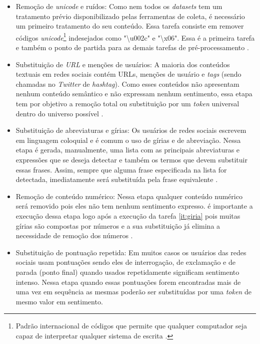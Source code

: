 \begin{itemize}
\item Remoção de \textit{unicode} e ruídos: Como nem todos os \textit{datasets} tem um tratamento prévio disponibilizado pelas ferramentas de coleta, é necessário um primeiro tratamento do seu conteúdo. Essa tarefa consiste em remover códigos \textit{unicode}\footnote{ Padrão internacional de códigos que permite que qualquer computador seja capaz de interpretar qualquer sistema de escrita \cite{0321480910}.} indesejados   como "\textbackslash u002c" e "\textbackslash x06". Essa é a primeira tarefa e também o ponto de partida para as demais tarefas de pré-processamento \cite{SYMEONIDIS2018298}.

\item Substituição de \textit{URL} e menções de usuários: A maioria dos conteúdos textuais em redes sociais contém URLs, menções de usuário e \textit{tags} (sendo chamadas no \textit{Twitter} de \textit{hashtag}). Como esses conteúdos não apresentam nenhum conteúdo semântico e não expressam nenhum sentimento, essa etapa tem por objetivo a remoção total ou substituição por um \textit{token} universal dentro do universo possível \cite{Khan2014}.
\label{it:giria}

\item Substituição de abreviaturas e gírias: Os usuários de redes sociais escrevem em linguagem coloquial e é comum o uso de gírias e de abreviação. Nessa etapa é gerada, manualmente, uma lista com as principais abreviaturas e expressões que se deseja detectar e também os termos que devem substituir essas frases. Assim, sempre que alguma frase especificada na lista for detectada, imediatamente será substituída pela frase equivalente \cite{Kouloumpis}.

\item Remoção de conteúdo numérico: Nessa etapa qualquer conteúdo numérico será removido pois eles não tem nenhum sentimento expresso. é importante a execução dessa etapa logo após a execução da tarefa \ref{it:giria} pois muitas gírias são compostas por números e a sua substituição já elimina a necessidade de remoção dos números \cite{He:2011:AEP:2002472.2002489}.

\item Substituição de pontuação repetida: Em muitos casos os usuários das redes sociais usam pontuações sendo eles de interrogação, de exclamação e de parada (ponto final) quando usados repetidamente significam sentimento intenso. Nessa etapa quando essas pontuações forem encontradas mais de uma vez em sequência as mesmas poderão ser substituídas por uma \textit{token} de mesmo valor em sentimento.


\end{itemize}
